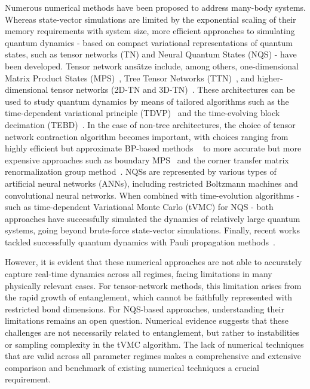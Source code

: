 \documentclass[aps,pra,reprint,amssymb,superscriptaddress]{revtex4-2}
\begin{document}
Numerous numerical methods have been proposed to address many-body systems. Whereas state-vector simulations are limited by the exponential scaling of their memory requirements with system size, more efficient approaches to simulating quantum dynamics - based on compact variational representations of quantum states, such as tensor networks (TN) and Neural Quantum States (NQS) - have been developed. Tensor network ansätze include, among others, one-dimensional Matrix Product States (MPS)~\cite{stoudenmire_studying_2012}, Tree Tensor Networks (TTN)~\cite{tagliacozzo_simulation_2009, murg_simulating_2010, schuhmacher_hybrid_2025}, and higher-dimensional tensor networks (2D-TN and 3D-TN)~\cite{verstraete_renormalization_2004,jordan_classical_2008,tindall_dynamics_2025}. These architectures can be used to study quantum dynamics by means of tailored algorithms such as the time-dependent variational principle (TDVP)~\cite{haegeman_time-dependent_2011} and the time-evolving block decimation (TEBD)~\cite{vidal_efficient_2004, verstraete_matrix_2004, white_real-time_2004}. In the case of non-tree architectures, the choice of tensor network contraction algorithm becomes important, with choices ranging from highly efficient but approximate BP-based methods ~\cite{jiang_accurate_2008, alkabetz_tensor_2021, tindall_gauging_2023, banuls_matrix_2009,abanin_colloquium_2019, lerose_influence_2021, park_simulating_2025} to more accurate but more expensive approaches such as boundary MPS~\cite{lubasch_algorithms_2014,verstraete_renormalization_2004, guo_block_2023} and the corner transfer matrix renormalization group method~\cite{nishino_corner_1996, orus_simulation_2009}. NQSs are represented by various types of artificial neural networks (ANNs), including restricted Boltzmann machines and convolutional neural networks.
When combined with time-evolution algorithms - such as time-dependent Variational Monte Carlo (tVMC) for NQS - both approaches have successfully simulated the dynamics of relatively large quantum systems, going beyond brute-force state-vector simulations. Finally, recent works tackled successfully quantum dynamics with Pauli propagation methods~\cite{rall_simulation_2019,rudolph_classical_2023,broers_exclusive-or_2024,broers_scalable_2025,begusic_real-time_2025,rudolph_pauli_2025}.

However, it is evident that these numerical approaches are not able to accurately capture real-time dynamics across all regimes, facing limitations in many physically relevant cases. 
For tensor-network methods, this limitation arises from the rapid growth of entanglement, which cannot be faithfully represented with restricted bond dimensions. 
For NQS-based approaches, understanding their limitations remains an open question. 
Numerical evidence suggests that these challenges are not necessarily related to entanglement, but rather to instabilities or sampling complexity in the tVMC algorithm.
The lack of numerical techniques that are valid across all parameter regimes makes a comprehensive and extensive comparison and benchmark of existing numerical techniques a crucial requirement. 
\end{document}
